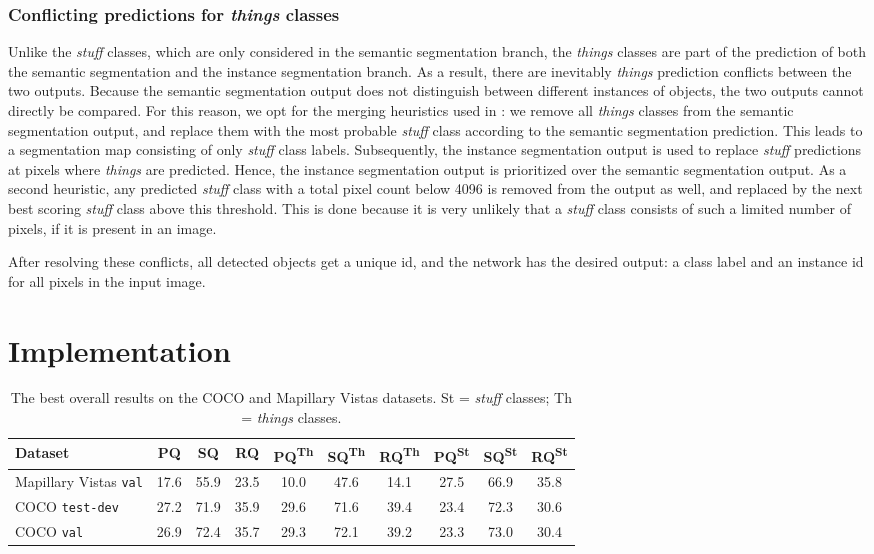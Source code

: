\documentclass[10pt,twocolumn,letterpaper]{article}
\begin{document}
\subsubsection{Conflicting predictions for \textit{things} classes}
Unlike the \textit{stuff} classes, which are only considered in the semantic segmentation branch, the \textit{things} classes are part of the prediction of both the semantic segmentation and the instance segmentation branch. As a result, there are inevitably \textit{things} prediction conflicts between the two outputs. Because the semantic segmentation output does not distinguish between different instances of objects, the two outputs cannot directly be compared. For this reason, we opt for the merging heuristics used in \cite{Kirillov2018}: we remove all \textit{things} classes from the semantic segmentation output, and replace them with the most probable \textit{stuff} class according to the semantic segmentation prediction. This leads to a segmentation map consisting of only \textit{stuff} class labels. Subsequently, the instance segmentation output is used to replace \textit{stuff} predictions at pixels where \textit{things} are predicted. Hence, the instance segmentation output is prioritized over the semantic segmentation output. As a second heuristic, any predicted \textit{stuff} class with a total pixel count below 4096 is removed from the output as well, and replaced by the next best scoring \textit{stuff} class above this threshold. This is done because it is very unlikely that a \textit{stuff} class consists of such a limited number of pixels, if it is present in an image.

After resolving these conflicts, all detected objects get a unique id, and the network has the desired output: a class label and an instance id for all pixels in the input image.




\section{Implementation}

\begin{table*}[ht]
\centering
\begin{tabular}{ l || c | c | c | c | c | c | c | c | c }
Dataset & PQ & SQ & RQ & PQ\textsuperscript{Th} & SQ\textsuperscript{Th} & RQ\textsuperscript{Th} & PQ\textsuperscript{St} & SQ\textsuperscript{St} & RQ\textsuperscript{St} \\
\hline
Mapillary Vistas \texttt{val} & 17.6 & 55.9 & 23.5 & 10.0 & 47.6 & 14.1 & 27.5 & 66.9 & 35.8 \\
COCO \texttt{test-dev} & 27.2 & 71.9 & 35.9 & 29.6 & 71.6 & 39.4 & 23.4 & 72.3 & 30.6 \\
COCO \texttt{val} & 26.9 & 72.4 & 35.7 & 29.3 & 72.1 & 39.2 & 23.3 & 73.0 & 30.4 \\
\end{tabular}
\caption{The best overall results on the COCO and Mapillary Vistas datasets. St = \textit{stuff} classes; Th = \textit{things} classes.}
\label{tab:overall_results}
\end{table*}
\end{document}
